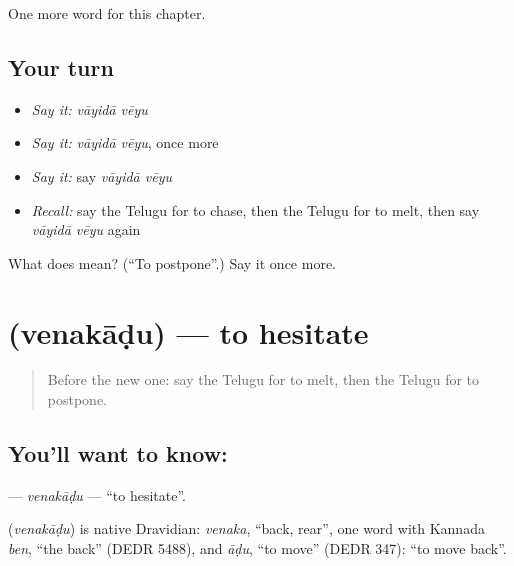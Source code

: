 \begin{grammarlens}[title={What you've built}]
One more word for this chapter.
\end{grammarlens}

\subsection*{Your turn}
\begin{itemize}
\raggedright
  \item \emph{Say it:} \emph{vāyidā vēyu}
  \item \emph{Say it:} \emph{vāyidā vēyu}, once more
  \item \emph{Say it:} say \emph{vāyidā vēyu}
  \item \emph{Recall:} say the Telugu for to chase, then the Telugu for to melt, then say \emph{vāyidā vēyu} again
\end{itemize}

\begin{tcolorbox}[breakable,colback=teal!4,colframe=teal!35!black,title={Before you move on}]
What does   mean? (\textquotedblleft{}To postpone\textquotedblright{}.) Say it once more.
\end{tcolorbox}
\section[\texorpdfstring{\te{వెనకాడు} (venakāḍu)}{వెనకాడు (venakāḍu)}]{ (venakāḍu) — to hesitate}

\label{lesson:TE-C286-venakadu}



\begin{quote}
Before the new one: say the Telugu for to melt, then the Telugu for to postpone.
\end{quote}

\subsection*{You'll want to know: }
\textbf{} — \emph{venakāḍu} — \textquotedblleft{}to hesitate\textquotedblright{}.

\begin{cousinweb}
\textbf{} (\emph{venakāḍu}) is native Dravidian: \emph{venaka}, \textquotedblleft{}back, rear\textquotedblright{}, one word with Kannada \emph{ben}, \textquotedblleft{}the back\textquotedblright{} (DEDR 5488), and \emph{āḍu}, \textquotedblleft{}to move\textquotedblright{} (DEDR 347): \textquotedblleft{}to move back\textquotedblright{}.
\end{cousinweb}

